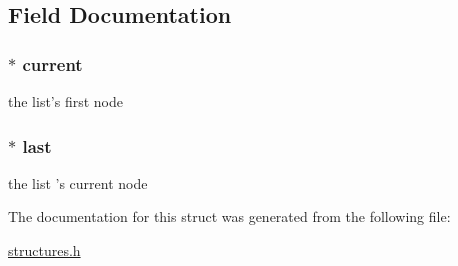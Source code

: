 \subsection{Field Documentation}
\hypertarget{structlist_a79bec8ecf9f3599d31d97683cc6f6c54}{
\subsubsection[{current}]{$\ast$ current}}\label{structlist_a79bec8ecf9f3599d31d97683cc6f6c54}
the list's first node \hypertarget{structlist_a1e751cb2643f0c20321d5b233e4fdf65}{
\subsubsection[{last}]{$\ast$ last}}\label{structlist_a1e751cb2643f0c20321d5b233e4fdf65}
the list 's current node 

The documentation for this struct was generated from the following file\-:\begin{DoxyCompactItemize}
\item 
\hyperlink{structures_8h}{structures.\-h}\end{DoxyCompactItemize}
